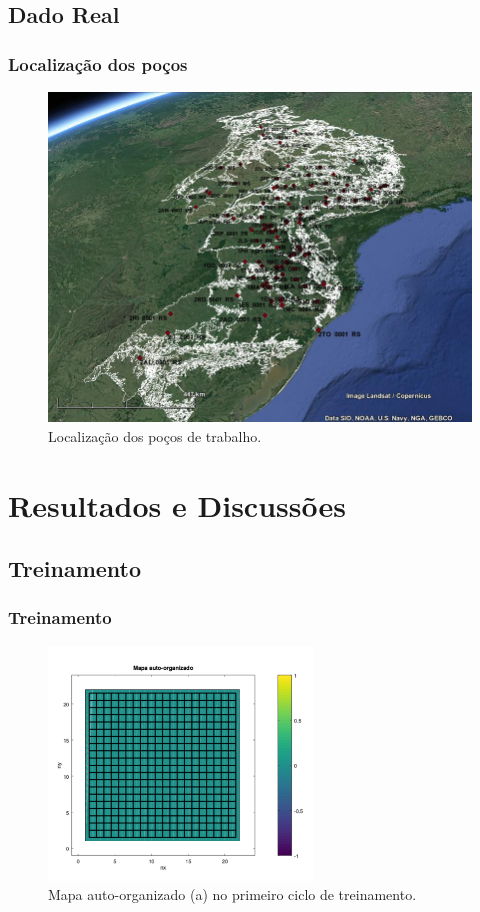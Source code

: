 \documentclass[10pt]{beamer} %
\begin{document}
\subsection{Dado Real}

\begin{frame}
	\frametitle{Localização dos poços}
	\begin{figure}[H]
		\centering
			\includegraphics[scale=0.25]{Imagens/Pocos.jpg}
		\caption{Localização dos poços de trabalho.}
		\label{real}
	\end{figure}
\end{frame}



\section{Resultados e Discussões}

\subsection{Treinamento}

\begin{frame}
	\frametitle{Treinamento}
	\begin{figure}
		\centering
		\includegraphics[width=7.0cm]{Imagens/SOM1_2d.pdf}
		\caption{Mapa auto-organizado (a) no primeiro ciclo de treinamento.}
	\end{figure}
\end{frame}
\end{document}
